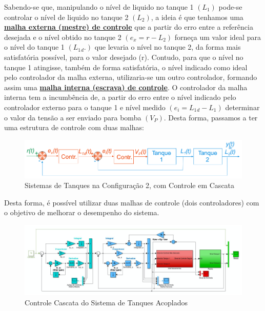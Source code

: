 \hspace{4ex}Sabendo-se que, manipulando o nível de liquido no tanque 1 \((L_1)\) pode-se controlar o nível de liquido
no tanque 2 \((L_2)\), a ideia é que tenhamos uma \textbf{\underline{malha externa (mestre) de controle}} que a partir do erro entre
a referência desejada e o nível obtido no tanque 2 \((e_x=r-L_2)\) forneça um valor ideal para o nível do tanque 1
\((L_1{}_d.)\) que levaria o nível no tanque 2, da forma mais satisfatória possível, para o valor desejado (r). Contudo,
para que o nível no tanque 1 atingisse, também de forma satisfatória, o nível indicado como ideal pelo
controlador da malha externa, utilizaria-se um outro controlador, formando assim uma \textbf{\underline{malha interna (escrava) de controle}}. O controlador da malha interna tem a incumbência de, a partir do erro entre o nível
indicado pelo controlador externo para o tanque 1 e nível medido \((e_i=L_1{}_d-L_1)\) determinar o valor da tensão
a ser enviado para bomba \((V_P)\). Desta forma, passamos a ter uma estrutura de controle com duas malhas:

\begin{figure}[h]
    \centering
    \includegraphics[width=15cm]{images/roteiro c/img ref teorico/config2_controle_cascata.PNG}
    \caption{Sistemas de Tanques na Configuração 2, com Controle em Cascata}
    \label{fig:config2_controle_cascata}
\end{figure}

\newpage

\hspace{4ex}Desta forma, é possível utilizar duas malhas de controle (dois controladores) com o objetivo de melhorar o desempenho do sistema.

\begin{figure}[h]
    \centering
    \includegraphics[width=18cm]{images/roteiro c/img ref teorico/controle_cascata.PNG}
    \caption{Controle Cascata do Sistema de Tanques Acoplados}
    \label{fig:controle_cascata}
\end{figure}

